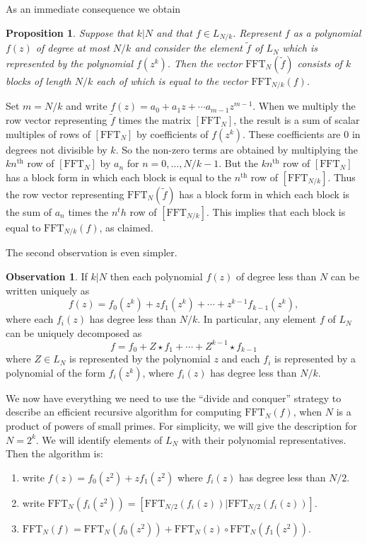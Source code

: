 \documentclass[12pt, letter, oneside]{amsart}
\theoremstyle{definition}
\newtheorem{observation}[para]{Observation}
\theoremstyle{plain}
\newtheorem{proposition}[para]{Proposition}
\numberwithin{equation}{para}
\numberwithin{figure}{section}
\newcommand{\FFT}{\text{FFT}}
\renewcommand{\th}{\text{th}}
\begin{document}
As an immediate consequence we obtain 
\begin{proposition}
Suppose that $k|N$ and that $f\in L_{N/k}$.  Represent $f$ as a
polynomial $f(z)$ of degree at most $N/k$ and consider the element
$\widetilde f$ of $L_N$ which is represented by the polynomial
$f(z^k)$.  Then the vector $\FFT_N(\widetilde f)$ consists of $k$
blocks of length $N/k$ each of which is equal to the vector
$\FFT_{N/k}(f)$.
\end{proposition}
\proof Set $m = N/k$ and write
$f(z) = a_0 + a_1z + \cdots a_{m-1}z^{m-1}$.  When we multiply the row
vector representing $\widetilde f$ times the matrix $[\FFT_N]$, the
result is a sum of scalar multiples of rows of $[\FFT_N]$ by
coefficients of $f(z^k)$.  These coefficients are $0$ in degrees not
divisible by $k$.  So the non-zero terms are obtained by multiplying
the $kn^\th$ row of $[\FFT_N]$ by $a_n$ for $n=0, \ldots, N/k-1$.  But
the $kn^\th$ row of $[\FFT_N]$ has a block form in which each block is
equal to the $n^\th$ row of $[\FFT_{N/k}]$.  Thus the row vector
representing $\FFT_N(\widetilde f)$ has a block form in which each
block is the sum of $a_n$ times the $n^th$ row of $[\FFT_{N/k}]$.
This implies that each block is equal to $\FFT_{N/k}(f)$, as claimed.
\endproof

The second observation is even simpler.
\begin{observation}\label{observation:decomposition}
If $k|N$ then each polynomial $f(z)$ of degree less than $N$ can be
written uniquely as
$$f(z) = f_0(z^k)+ zf_1(z^k) + \cdots + z^{k-1}f_{k-1}(z^k),$$
where each $f_i(z)$ has degree less than $N/k$.  In particular, any
element $f$ of $L_N$ can be uniquely decomposed as
$$f = f_0+ Z\star f_1 + \cdots + Z^{k-1}\star f_{k-1}$$
where $Z\in L_N$ is represented by the polynomial $z$ and each $f_i$
is represented by a polynomial of the form $f_i(z^k)$, where $f_i(z)$
has degree less than $N/k$.
\end{observation}

We now have everything we need to use the ``divide and conquer''
strategy to describe an efficient recursive algorithm for computing
$\FFT_N(f)$, when $N$ is a product of powers of small primes.  For
simplicity, we will give the description for $N = 2^k$. We will
identify elements of $L_N$ with their polynomial representatives.
Then the algorithm is:

\begin{enumerate}
\item write $f(z) = f_0(z^2)+ zf_1(z^2)$ where $f_i(z)$ has degree less than $N/2$.
\item write $\FFT_N(f_i(z^2)) = [\FFT_{N/2}(f_i(z)) | \FFT_{N/2}(f_i(z))]$.
\item $\FFT_N(f) = \FFT_{N}(f_0(z^2)) + \FFT_{N}(z)\circ\FFT_{N}(f_1(z^2))$.
\end{enumerate}
\end{document}
